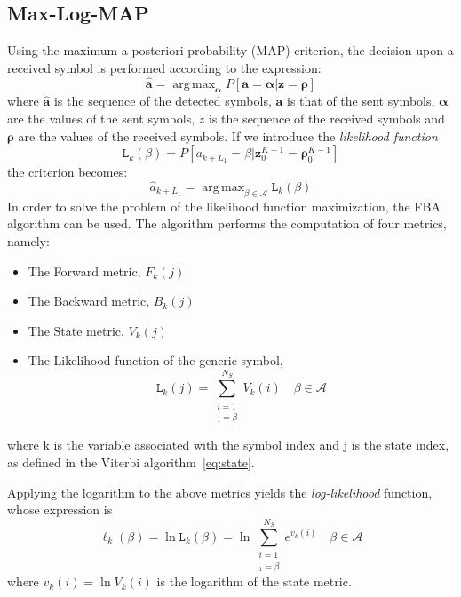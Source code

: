 \documentclass[10pt]{article}
\DeclareMathOperator*{\argmax}{arg\,max}
\begin{document}
\subsection*{Max-Log-MAP}
Using the maximum a posteriori probability (MAP) criterion, the decision upon a received symbol is performed according to the expression:
\begin{equation}
	\hat{\boldsymbol{a}} = \argmax_{\boldsymbol{\alpha}} P[\boldsymbol{a} = \boldsymbol{\alpha} | \boldsymbol{z} = \boldsymbol{\rho}]
\end{equation}
where $\hat{\boldsymbol{a}}$ is the sequence of the detected symbols, $\boldsymbol{a}$ is that of the sent symbols, $\boldsymbol{\alpha}$ are the values of the sent symbols, $z$ is the sequence of the received symbols and $\boldsymbol{\rho}$ are the values of the received symbols.
If we introduce the \emph{likelihood function}
\begin{equation}
	\mathtt{L}_k(\beta) = P[a_{k+L_1} = \beta | \mathbf{z}_0^{K-1} = \boldsymbol{\rho}_0^{K-1}]
\end{equation}
the criterion becomes:
\begin{equation}
	\hat{a}_{k+L_1} = \argmax_{\beta \in \mathcal{A}} \mathtt{L}_k(\beta)
\end{equation}
In order to solve the problem of the likelihood function maximization, the FBA algorithm can be used. The algorithm performs the computation of four metrics, namely:
\begin{itemize}
	\item The Forward metric, $F_k(j)$
	\item The Backward metric, $B_k(j)$
	\item The State metric, $V_k(j)$
	\item The Likelihood function of the generic symbol,
	\begin{equation}
	 	\mathtt{L}_k(j) = \sum_{\substack{i = 1 \\ [\boldsymbol{\sigma}_i]_1 = \beta}}^{N_S} V_k(i) \quad \beta \in \mathcal{A}
	 \end{equation} 
\end{itemize}
where k is the variable associated with the symbol index and j is the state index, as defined in the Viterbi algorithm~\eqref{eq:state}.

Applying the logarithm to the above metrics yields the \emph{log-likelihood} function, whose expression is 
\begin{equation}
	\ell_k(\beta) = \ln \mathtt{L}_k(\beta) = \ln \sum_{\substack{i = 1 \\ [\boldsymbol{\sigma}_i]_1 = \beta}}^{N_S} e^{v_k(i)} \quad \beta \in \mathcal{A}
\end{equation}
where $v_k(i) = \ln V_k(i)$ is the logarithm of the state metric.
\end{document}
